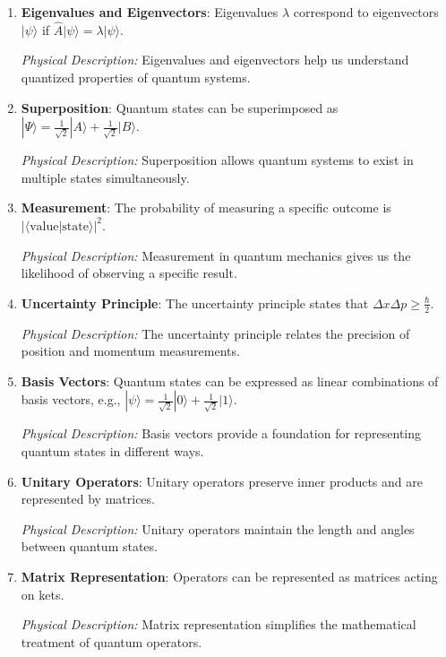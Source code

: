 \documentclass[a4paper]{article}
\begin{document}
\begin{enumerate}
    \item \textbf{Eigenvalues and Eigenvectors}: Eigenvalues $\lambda$ correspond to eigenvectors $|\psi\rangle$ if $\hat{A}|\psi\rangle = \lambda|\psi\rangle$.
    
    \textit{Physical Description:} Eigenvalues and eigenvectors help us understand quantized properties of quantum systems.

    \item \textbf{Superposition}: Quantum states can be superimposed as $|\Psi\rangle = \frac{1}{\sqrt{2}}|A\rangle + \frac{1}{\sqrt{2}}|B\rangle$.
    
    \textit{Physical Description:} Superposition allows quantum systems to exist in multiple states simultaneously.

    \item \textbf{Measurement}: The probability of measuring a specific outcome is $|\langle\text{value}|\text{state}\rangle|^2$.
    
    \textit{Physical Description:} Measurement in quantum mechanics gives us the likelihood of observing a specific result.

    \item \textbf{Uncertainty Principle}: The uncertainty principle states that $\Delta x \Delta p \geq \frac{\hbar}{2}$.
    
    \textit{Physical Description:} The uncertainty principle relates the precision of position and momentum measurements.

    \item \textbf{Basis Vectors}: Quantum states can be expressed as linear combinations of basis vectors, e.g., $|\psi\rangle = \frac{1}{\sqrt{2}}|0\rangle + \frac{1}{\sqrt{2}}|1\rangle$.
    
    \textit{Physical Description:} Basis vectors provide a foundation for representing quantum states in different ways.

    \item \textbf{Unitary Operators}: Unitary operators preserve inner products and are represented by matrices.
    
    \textit{Physical Description:} Unitary operators maintain the length and angles between quantum states.

    \item \textbf{Matrix Representation}: Operators can be represented as matrices acting on kets.
    
    \textit{Physical Description:} Matrix representation simplifies the mathematical treatment of quantum operators.


\end{enumerate}
\end{document}
